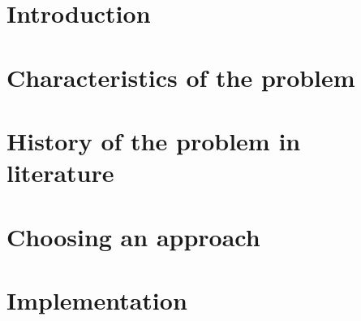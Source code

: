 \documentclass[
    fontsize=10pt,    %
    a4paper,      %
    parskip=half-,    %
    twoside,      %
    headings=big,  %
    appendixprefix=true,
    ]{scrreprt}    %
\begin{document}
\clearpage

\clearpage


\cleardoublepage
\pagestyle{fancy}



\chapter{Introduction}\label{chapter:einleitung}



%

\chapter{Characteristics of the problem}\label{chapter:xxxname1xxx}
%


\chapter{History of the problem in literature}\label{chapter:xxxname1_2xxx}


\chapter{Choosing an approach}\label{chapter:xxxname2xxx}
%


\chapter{Implementation}\label{chapter:xxxname3xxx}
%

\end{document}

